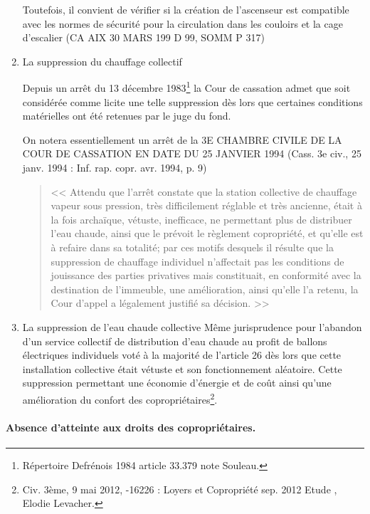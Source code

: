 \begin{enumerate}
					Toutefois, il convient de vérifier si la création de l’ascenseur est compatible avec les normes de sécurité pour la circulation dans les couloirs et la cage d’escalier (CA AIX 30 MARS 199 D 99, SOMM P 317)
					
					\item La suppression du chauffage collectif
					
					Depuis un arrêt du 13 décembre 1983\footnote{Répertoire Defrénois 1984 article 33.379 note Souleau.} la Cour de cassation admet que soit considérée comme licite une telle suppression dès lors que certaines conditions matérielles ont été retenues par le juge du fond.
					
					On notera essentiellement un arrêt de la 3E CHAMBRE CIVILE DE LA COUR DE CASSATION EN DATE DU 25 JANVIER 1994 (Cass. 3e civ., 25 janv. 1994 : Inf. rap. copr. avr. 1994, p. 9)
		
					\begin{quote}
						<< Attendu que l'arrêt constate que la station collective de chauffage vapeur sous pression, très difficilement réglable et très ancienne, était à la fois archaïque, vétuste, inefficace, ne permettant plus de distribuer l'eau chaude, ainsi que le prévoit le règlement copropriété, et qu'elle est à refaire dans sa totalité; par ces motifs desquels il résulte que la suppression de chauffage individuel n'affectait pas les conditions de jouissance des parties privatives mais constituait, en conformité avec la destination de l'immeuble, une amélioration, ainsi qu'elle l’a retenu, la Cour d'appel a légalement justifié sa décision. >>
					\end{quote}
					
					\item La suppression de l’eau chaude collective
					Même jurisprudence pour l’abandon d’un service collectif de distribution d’eau chaude au profit de ballons électriques individuels voté à la majorité de l’article 26 dès lors que cette installation collective était vétuste et son fonctionnement aléatoire. Cette suppression permettant une économie d’énergie et de coût ainsi qu’une amélioration du confort des copropriétaires\footnote{Civ. 3ème, 9 mai 2012, -16226 : Loyers et Copropriété sep. 2012 Etude , Elodie Levacher.}.
				\end{enumerate}
		
			\paragraph{Absence d’atteinte aux droits des copropriétaires.}
			
